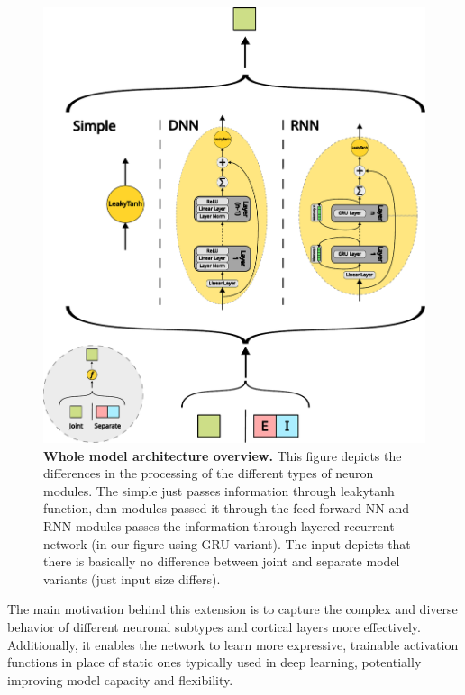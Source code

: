 \begin{figure}
    \centering
    \includegraphics[width=\linewidth]{img/neuron_module.pdf}
    \caption{\textbf{Whole model architecture overview.} This figure depicts the differences in the processing of the different types of neuron modules. The simple just passes information through leakytanh function, dnn modules passed it through the feed-forward NN and RNN modules passes the information through layered recurrent network (in our figure using GRU variant). The input depicts that there is basically no difference between joint and separate model variants (just input size differs).}
    \label{fig:neuron_modules}
\end{figure}

The main motivation behind this extension is to capture the complex and diverse behavior of different neuronal subtypes and cortical layers more effectively. Additionally, it enables the network to learn more expressive, trainable activation functions in place of static ones typically used in deep learning, potentially improving model capacity and flexibility.

